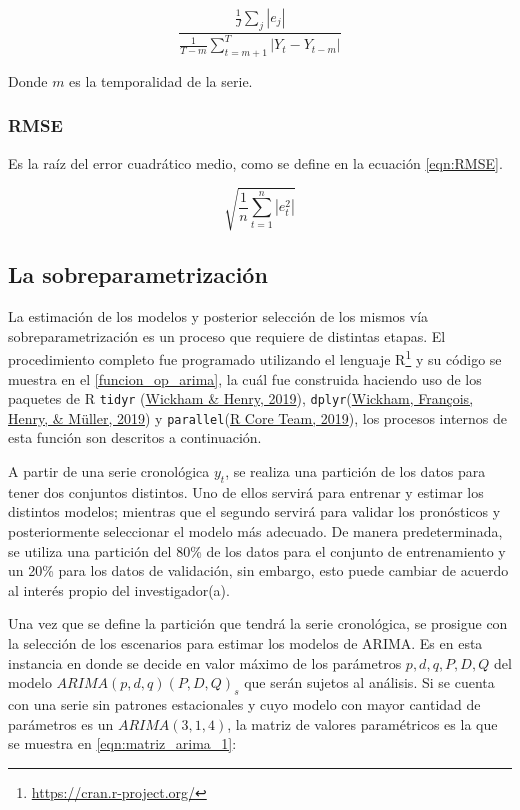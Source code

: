 \documentclass[
]{article}
\begin{document}
\begin{equation}
\label{eqn:MASE_si}
\frac{\frac{1}{J}\sum_j|e_j|}{\frac{1}{T-m}\sum_{t=m+1}^T|Y_t-Y_{t-m}|}
\end{equation}

Donde \(m\) es la temporalidad de la serie.

\subsubsection{RMSE}

Es la raíz del error cuadrático medio, como se define en la ecuación
\ref{eqn:RMSE}.

\begin{equation}
\label{eqn:RMSE}
\sqrt{\frac{1}{n}\sum_{t=1}^n |e_t^2|}
\end{equation}

\subsection{La sobreparametrización}

La estimación de los modelos y posterior selección de los mismos vía
sobreparametrización es un proceso que requiere de distintas etapas. El
procedimiento completo fue programado utilizando el lenguaje
R\footnote{\url{https://cran.r-project.org/}} y su código se muestra en
el \ref{funcion_op_arima}, la cuál fue construida haciendo uso de los
paquetes de R \texttt{tidyr} (\protect\hyperlink{ref-tidyr}{Wickham \&
Henry, 2019}), \texttt{dplyr}(\protect\hyperlink{ref-dplyr}{Wickham,
François, Henry, \& Müller, 2019}) y
\texttt{parallel}(\protect\hyperlink{ref-parallel}{R Core Team, 2019}),
los procesos internos de esta función son descritos a continuación.

A partir de una serie cronológica \(y_t\), se realiza una partición de
los datos para tener dos conjuntos distintos. Uno de ellos servirá para
entrenar y estimar los distintos modelos; mientras que el segundo
servirá para validar los pronósticos y posteriormente seleccionar el
modelo más adecuado. De manera predeterminada, se utiliza una partición
del 80\% de los datos para el conjunto de entrenamiento y un 20\% para
los datos de validación, sin embargo, esto puede cambiar de acuerdo al
interés propio del investigador(a).

Una vez que se define la partición que tendrá la serie cronológica, se
prosigue con la selección de los escenarios para estimar los modelos de
ARIMA. Es en esta instancia en donde se decide en valor máximo de los
parámetros \(p,d,q,P,D,Q\) del modelo \(ARIMA(p,d,q)(P,D,Q)_s\) que
serán sujetos al análisis. Si se cuenta con una serie sin patrones
estacionales y cuyo modelo con mayor cantidad de parámetros es un
\(ARIMA(3,1,4)\), la matriz de valores paramétricos es la que se muestra
en \ref{eqn:matriz_arima_1}:
\end{document}
